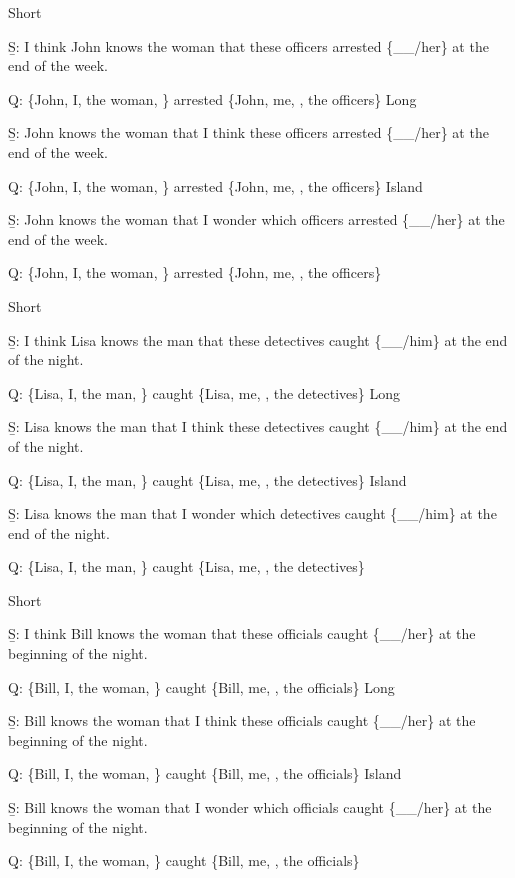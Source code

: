 \pex 
\a Short\par\nobreak
\beginsubsub
\b{S:} I think John knows the woman that these officers arrested \{\_\_/her\} at the end of the week.\par\nobreak
\b{Q:} \{John, I, the woman, \} arrested \{John, me, , the officers\}
\endsubsub
\a Long\par\nobreak
\beginsubsub
\b{S:} John knows the woman that I think these officers arrested \{\_\_/her\} at the end of the week.\par\nobreak
\b{Q:} \{John, I, the woman, \} arrested \{John, me, , the officers\}
\endsubsub
\a Island\par\nobreak
\beginsubsub
\b{S:} John knows the woman that I wonder which officers arrested \{\_\_/her\} at the end of the week.\par\nobreak
\b{Q:} \{John, I, the woman, \} arrested \{John, me, , the officers\}
\endsubsub
\xe

\pex 
\a Short\par\nobreak
\beginsubsub
\b{S:} I think Lisa knows the man that these detectives caught \{\_\_/him\} at the end of the night.\par\nobreak
\b{Q:} \{Lisa, I, the man, \} caught \{Lisa, me, , the detectives\}
\endsubsub
\a Long\par\nobreak
\beginsubsub
\b{S:} Lisa knows the man that I think these detectives caught \{\_\_/him\} at the end of the night.\par\nobreak
\b{Q:} \{Lisa, I, the man, \} caught \{Lisa, me, , the detectives\}
\endsubsub
\a Island\par\nobreak
\beginsubsub
\b{S:} Lisa knows the man that I wonder which detectives caught \{\_\_/him\} at the end of the night.\par\nobreak
\b{Q:} \{Lisa, I, the man, \} caught \{Lisa, me, , the detectives\}
\endsubsub
\xe

\pex 
\a Short\par\nobreak
\beginsubsub
\b{S:} I think Bill knows the woman that these officials caught \{\_\_/her\} at the beginning of the night.\par\nobreak
\b{Q:} \{Bill, I, the woman, \} caught \{Bill, me, , the officials\}
\endsubsub
\a Long\par\nobreak
\beginsubsub
\b{S:} Bill knows the woman that I think these officials caught \{\_\_/her\} at the beginning of the night.\par\nobreak
\b{Q:} \{Bill, I, the woman, \} caught \{Bill, me, , the officials\}
\endsubsub
\a Island\par\nobreak
\beginsubsub
\b{S:} Bill knows the woman that I wonder which officials caught \{\_\_/her\} at the beginning of the night.\par\nobreak
\b{Q:} \{Bill, I, the woman, \} caught \{Bill, me, , the officials\}
\endsubsub
\xe

